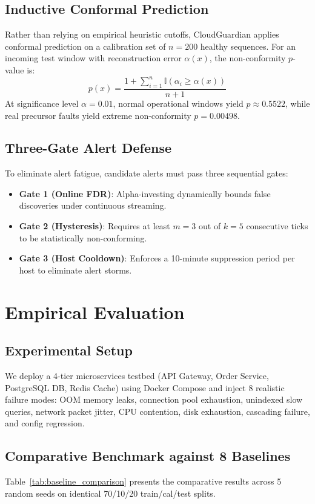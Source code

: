 \documentclass[conference]{IEEEtran}
\begin{document}
\subsection{Inductive Conformal Prediction}
Rather than relying on empirical heuristic cutoffs, CloudGuardian applies conformal prediction on a calibration set of $n=200$ healthy sequences. For an incoming test window with reconstruction error $\alpha(x)$, the non-conformity $p$-value is:
\begin{equation}
p(x) = \frac{1 + \sum_{i=1}^n \mathbb{I}(\alpha_i \ge \alpha(x))}{n + 1}
\end{equation}
At significance level $\alpha = 0.01$, normal operational windows yield $p \approx 0.5522$, while real precursor faults yield extreme non-conformity $p = 0.00498$.

\subsection{Three-Gate Alert Defense}
To eliminate alert fatigue, candidate alerts must pass three sequential gates:
\begin{itemize}
    \item \textbf{Gate 1 (Online FDR)}: Alpha-investing dynamically bounds false discoveries under continuous streaming.
    \item \textbf{Gate 2 (Hysteresis)}: Requires at least $m=3$ out of $k=5$ consecutive ticks to be statistically non-conforming.
    \item \textbf{Gate 3 (Host Cooldown)}: Enforces a 10-minute suppression period per host to eliminate alert storms.
\end{itemize}

\section{Empirical Evaluation}

\subsection{Experimental Setup}
We deploy a 4-tier microservices testbed (API Gateway, Order Service, PostgreSQL DB, Redis Cache) using Docker Compose and inject 8 realistic failure modes: OOM memory leaks, connection pool exhaustion, unindexed slow queries, network packet jitter, CPU contention, disk exhaustion, cascading failure, and config regression.

\subsection{Comparative Benchmark against 8 Baselines}
Table~\ref{tab:baseline_comparison} presents the comparative results across 5 random seeds on identical 70/10/20 train/cal/test splits.
\end{document}
